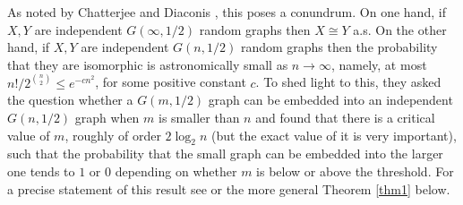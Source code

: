 \documentclass[reqno]{amsart}
\theoremstyle{theorem}
\theoremstyle{definition}
\theoremstyle{remark}
\def\N{\mathbb{N}}
\newcommand{\1}{{\text{\Large $\mathfrak 1$}}}	%
\numberwithin{equation}{section}
\begin{document}
As noted by Chatterjee and Diaconis \cite{ChD23}, this poses a conundrum.
On one hand, if $X, Y$ are independent $G(\infty,1/2)$ random graphs
then $X \cong Y$ a.s.
On the other hand, if  $X, Y$ are independent $G(n,1/2)$ random graphs
then the probability that they 
are isomorphic is astronomically small as $n \to \infty$, 
namely, at most $n!/2^{\binom{n}{2}} \le e^{-c n^2}$, for some 
positive constant $c$.
To shed light to this,
they asked the question whether a $G(m,1/2)$
graph can be embedded into an independent $G(n,1/2)$ graph when $m$ is smaller
than $n$ and found that there is a critical value of $m$,
roughly of order $2\log_2 n$ (but the exact value of it
is very important), such that the probability that the
small graph can be embedded into the larger one tends to $1$ or $0$
depending on whether $m$ is  below or above the threshold.
For a precise statement of this result see \cite[Thm.\ 1.2]{ChD23}
or the more general Theorem \ref{thm1} below.
\end{document}
